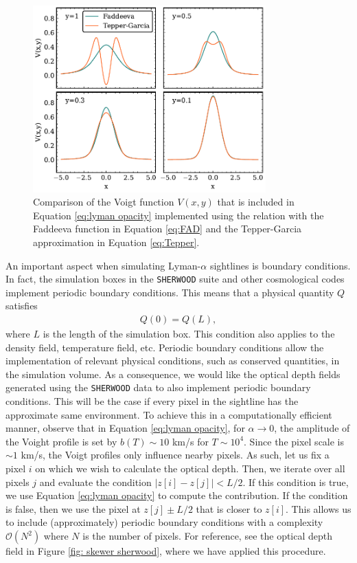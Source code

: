 \begin{figure}[ht]
        \centering
        \includegraphics[width=0.8\textwidth]{img/ML/TP-FA.pdf}
        \caption{Comparison of the Voigt function $V(x,y)$ that is included in Equation \ref{eq:lyman opacity} implemented using the relation with the Faddeeva function in Equation \ref{eq:FAD} and the Tepper-Garcia approximation in Equation \ref{eq:Tepper}.}
        \label{fig: VOIGT APPROX}     
\end{figure}

An important aspect when simulating Lyman-$\alpha$ sightlines is boundary conditions. In fact, the simulation boxes in the \texttt{SHERWOOD} suite and other cosmological codes implement periodic boundary conditions. This means that a physical quantity $Q$ satisfies
\begin{eqnarray}
        Q(0)=Q(L),
\end{eqnarray}
where $L$ is the length of the simulation box. This condition also applies to the density field, temperature field, etc. Periodic boundary conditions allow the implementation of relevant physical conditions, such as conserved quantities, in the simulation volume. As a consequence, we would like the optical depth fields generated using the \texttt{SHERWOOD} data to also implement periodic boundary conditions. This will be the case if every pixel in the sightline has the approximate same environment. To achieve this in a computationally efficient manner, observe that in Equation \ref{eq:lyman opacity}, for $\alpha\to 0$, the amplitude of the Voight profile is set by $b(T)\sim 10$ km/s for $T\sim 10^4$. Since the pixel scale is $\sim 1$ km/s, the Voigt profiles only influence nearby pixels. As such, let us fix a pixel $i$ on which we wish to calculate the optical depth. Then, we iterate over all pixels $j$ and evaluate the condition $|z[i]-z[j]| < L/2$. If this condition is true, we use Equation \ref{eq:lyman opacity} to compute the contribution. If the condition is false, then we use the pixel at $z[j]\pm L/2$ that is closer to $z[i]$. This allows us to include (approximately) periodic boundary conditions with a complexity $\mathcal{O}(N^2)$ where $N$ is the number of pixels. For reference, see the optical depth field in Figure \ref{fig: skewer sherwood}, where we have applied this procedure.



